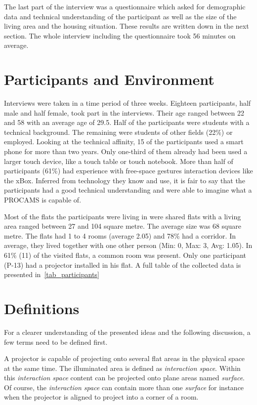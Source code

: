 The last part of the interview was a questionnaire which asked for demographic data and technical understanding of the participant as well as the size of the living area and the housing situation. These results are written down in the next section. The whole interview including the questionnaire took 56 minutes on average.

			
\section{Participants and Environment}
Interviews were taken in a time period of three weeks. Eighteen participants, half male and half female, took part in the interviews. Their age ranged between 22 and 58 with an average age of 29.5.  Half of the participants were students with a technical background. The remaining were students of other fields (22\%) or employed. Looking at the technical affinity, 15 of the participants used a smart phone for more than two years. Only one-third of them already had been used a larger touch device, like a touch table or touch notebook. More than half of participants (61\%) had experience with free-space gestures interaction devices like the xBox. Inferred from technology they know and use, it is fair to say that the participants had a good technical understanding and were able to imagine what a \ac{PROCAMS} is capable of.

Most of the flats the participants were living in were shared flats with a living area ranged between 27 and 104 square metre. The average size was 68 square metre. The flats had 1 to 4 rooms (average 2.05) and 78\% had a corridor. In average, they lived together with one other person (Min: 0, Max: 3, Avg: 1.05). In 61\% (11) of the visited flats, a common room was present. 
Only one participant (P-13) had a projector installed in his flat. A full table of the collected data is presented in~\autoref{tab_participants}

\section{Definitions}
For a clearer understanding of the presented ideas and the following discussion, a few terms need to be defined first.

A projector is capable of projecting onto several flat areas in the physical space at the same time. The illuminated area is defined as \emph{interaction space}. Within this \emph{interaction space} content can be projected onto plane areas named \emph{surface}. Of course, the \emph{interaction space} can contain more than one \emph{surface} for instance when the projector is aligned to project into a corner of a room. 

